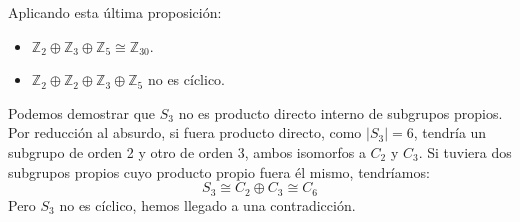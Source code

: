 \begin{ejemplo}
    Aplicando esta última proposición:
    \begin{itemize}
        \item $\mathbb{Z}_2\oplus\mathbb{Z}_3\oplus\mathbb{Z}_5 \cong \mathbb{Z}_{30}$.
        \item $\mathbb{Z}_2\oplus\mathbb{Z}_2\oplus\mathbb{Z}_3\oplus\mathbb{Z}_5$ no es cíclico.
    \end{itemize}
\end{ejemplo}

\begin{ejemplo} %
    Podemos demostrar que $S_3$ no es producto directo interno de subgrupos propios. Por reducción al absurdo, si fuera producto directo, como $|S_3| = 6$, tendría un subgrupo de orden 2 y otro de orden 3, ambos isomorfos a $C_2$ y $C_3$. Si tuviera dos subgrupos propios cuyo producto propio fuera él mismo, tendríamos:
    \begin{equation*}
        S_3 \cong C_2\oplus C_3\cong C_6
    \end{equation*}
    Pero $S_3$ no es cíclico, hemos llegado a una contradicción.
\end{ejemplo}

